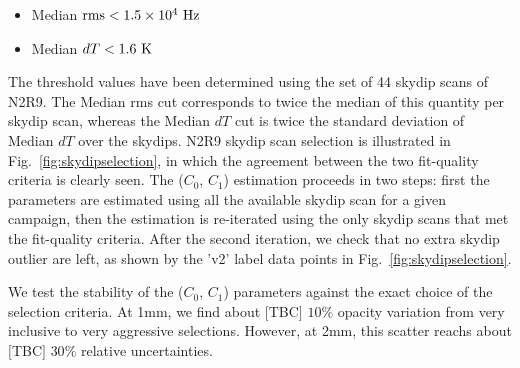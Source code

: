 \begin{itemize}
\item Median $\rm{rms} < 1.5 \times 10^{4}~\rm{Hz}$
\item Median $dT < 1.6~\rm{K}$
\end{itemize}

The threshold values have been determined using the set of 44 skydip
scans of N2R9. The Median rms cut corresponds to twice the median of
this quantity per skydip scan, whereas the Median $dT$ cut is twice
the standard deviation of Median $dT$ over the skydips. N2R9 skydip
scan selection is illustrated in Fig.~\ref{fig:skydipselection}, in
which the agreement between the two fit-quality criteria is clearly
seen. The ($C_0$, $C_1$) estimation proceeds in two steps: first the
parameters are estimated using all the available skydip scan for a
given campaign, then the estimation is re-iterated using the only
skydip scans that met the fit-quality criteria. After the second
iteration, we check that no extra skydip outlier are left, as shown by
the 'v2' label data points in Fig.~\ref{fig:skydipselection}.


We test the stability of the ($C_0$, $C_1$) parameters against the exact choice of the selection criteria.  
At 1mm, we find about {\color{red} $[$TBC$]$  $10\%$} opacity variation from very inclusive to very aggressive selections. However, at 2mm, this scatter reachs about {\color{red} $[$TBC$]$  $30\%$} relative uncertainties.






